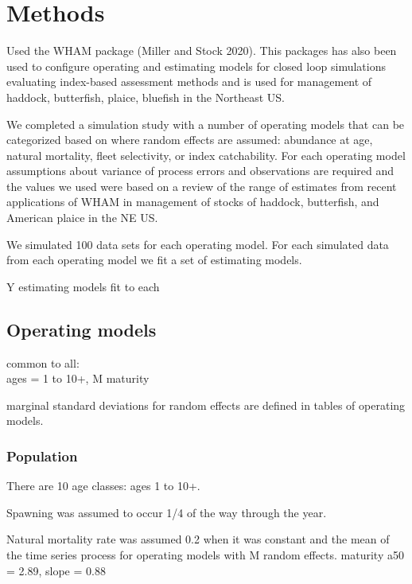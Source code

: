 \documentclass[
  12pt,
]{article}
\begin{document}
\hypertarget{methods}{%
\section{Methods}\label{methods}}

Used the WHAM package \citep[][commit 77bbd94]{stockmiller21} (Miller
and Stock 2020). This packages has also been used to configure operating
and estimating models for closed loop simulations evaluating index-based
assessment methods \citep{legaultetalinpress} and is used for management
of haddock, butterfish, plaice, bluefish in the Northeast US.

We completed a simulation study with a number of operating models that
can be categorized based on where random effects are assumed: abundance
at age, natural mortality, fleet selectivity, or index catchability. For
each operating model assumptions about variance of process errors and
observations are required and the values we used were based on a review
of the range of estimates from recent applications of WHAM in management
of stocks of haddock, butterfish, and American plaice in the NE US.

We simulated 100 data sets for each operating model. For each simulated
data from each operating model we fit a set of estimating models.

Y estimating models fit to each

\hypertarget{operating-models}{%
\subsection{Operating models}\label{operating-models}}

common to all:\\
ages = 1 to 10+, M maturity

marginal standard deviations for random effects are defined in tables of
operating models.

\hypertarget{population}{%
\subsubsection{Population}\label{population}}

There are 10 age classes: ages 1 to 10+.

Spawning was assumed to occur 1/4 of the way through the year.

Natural mortality rate was assumed 0.2 when it was constant and the mean
of the time series process for operating models with M random effects.
maturity a50 = 2.89, slope = 0.88
\end{document}
